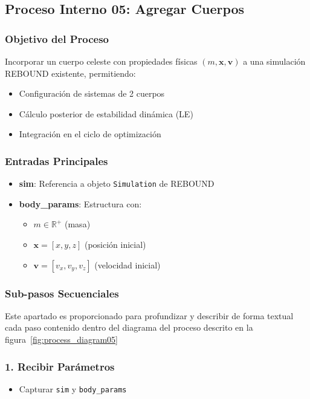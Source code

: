 \subsection{Proceso Interno 05: Agregar Cuerpos}

\subsubsection{Objetivo del Proceso}
Incorporar un cuerpo celeste con propiedades físicas $(m, \mathbf{x}, \mathbf{v})$ a una simulación REBOUND existente, permitiendo:
\begin{itemize}
    \item Configuración de sistemas de 2 cuerpos
    \item Cálculo posterior de estabilidad dinámica (LE)
    \item Integración en el ciclo de optimización
\end{itemize}

\subsubsection{Entradas Principales}
\begin{itemize}
    \item \textbf{sim}: Referencia a objeto \texttt{Simulation} de REBOUND
    \item \textbf{body\_params}: Estructura con:
    \begin{itemize}
        \item $m \in \mathbb{R}^+$ (masa)
        \item $\mathbf{x} = [x, y, z]$ (posición inicial)
        \item $\mathbf{v} = [v_x, v_y, v_z]$ (velocidad inicial)
    \end{itemize}
\end{itemize}

\subsubsection{Sub-pasos Secuenciales}
Este apartado es proporcionado para profundizar y describir de forma textual cada paso contenido dentro del diagrama del proceso descrito en la figura~\ref{fig:process_diagram05}
\subsubsection*{1. Recibir Parámetros}
\begin{itemize}
    \item Capturar \texttt{sim} y \texttt{body\_params}
\end{itemize}

